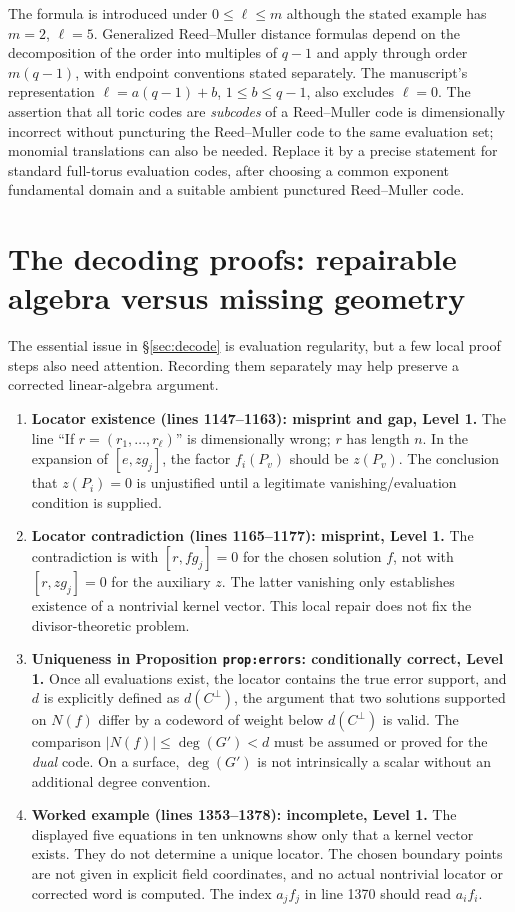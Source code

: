 \documentclass[12pt,letterpaper]{article}
\newcommand{\level}[1]{\textsf{Level #1}}
\begin{document}
The formula is introduced under $0\le\ell\le m$ although the stated example has $m=2$, $\ell=5$.  Generalized Reed--Muller distance formulas depend on the decomposition of the order into multiples of $q-1$ and apply through order $m(q-1)$, with endpoint conventions stated separately.  The manuscript's representation $\ell=a(q-1)+b$, $1\le b\le q-1$, also excludes $\ell=0$.  The assertion that all toric codes are \emph{subcodes} of a Reed--Muller code is dimensionally incorrect without puncturing the Reed--Muller code to the same evaluation set; monomial translations can also be needed.  Replace it by a precise statement for standard full-torus evaluation codes, after choosing a common exponent fundamental domain and a suitable ambient punctured Reed--Muller code.

\section{The decoding proofs: repairable algebra versus missing geometry}\label{sec:proofs}
The essential issue in \S\ref{sec:decode} is evaluation regularity, but a few local proof steps also need attention.  Recording them separately may help preserve a corrected linear-algebra argument.

\begin{enumerate}[label=\textbf{D\arabic*.},leftmargin=*]
\item \textbf{Locator existence (lines 1147--1163): misprint and gap, \level{1}.}  The line ``If $r=(r_1,\ldots,r_\ell)$'' is dimensionally wrong; $r$ has length $n$.  In the expansion of $[e,zg_j]$, the factor $f_i(P_v)$ should be $z(P_v)$.  The conclusion that $z(P_i)=0$ is unjustified until a legitimate vanishing/evaluation condition is supplied.
\item \textbf{Locator contradiction (lines 1165--1177): misprint, \level{1}.}  The contradiction is with $[r,fg_j]=0$ for the chosen solution $f$, not with $[r,zg_j]=0$ for the auxiliary $z$.  The latter vanishing only establishes existence of a nontrivial kernel vector.  This local repair does not fix the divisor-theoretic problem.
\item \textbf{Uniqueness in Proposition \texttt{prop:errors}: conditionally correct, \level{1}.}  Once all evaluations exist, the locator contains the true error support, and $d$ is explicitly defined as $d(C^\perp)$, the argument that two solutions supported on $N(f)$ differ by a codeword of weight below $d(C^\perp)$ is valid.  The comparison $|N(f)|\le\deg(G')<d$ must be assumed or proved for the \emph{dual} code.  On a surface, $\deg(G')$ is not intrinsically a scalar without an additional degree convention.
\item \textbf{Worked example (lines 1353--1378): incomplete, \level{1}.}  The displayed five equations in ten unknowns show only that a kernel vector exists.  They do not determine a unique locator.  The chosen boundary points are not given in explicit field coordinates, and no actual nontrivial locator or corrected word is computed.  The index $a_jf_j$ in line 1370 should read $a_if_i$.
\end{enumerate}
\end{document}
